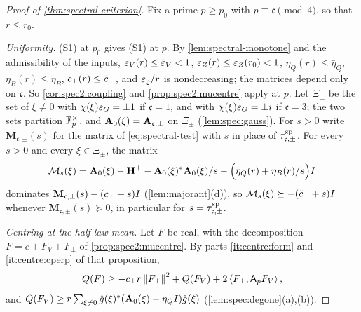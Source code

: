 \begin{proof}[Proof of \cref{thm:spectral-criterion}]
Fix a prime $p\ge p_0$ with $p\equiv\mathfrak c\pmod4$, so that $r\le r_0$.

\emph{Uniformity.} (S1) at $p_0$ gives (S1) at $p$. By \cref{lem:spectral-monotone} and
the admissibility of the inputs, $\varepsilon_V(r)\le\bar{\varepsilon}_V<1$, $\varepsilon_Z(r)\le\varepsilon_Z(r_0)<1$,
$\eta_Q(r)\le\bar\eta_Q$, $\eta_B(r)\le\bar\eta_B$, $c_\perp(r)\le\bar c_{\perp}$, and $\varepsilon_\varrho/r$ is
nondecreasing; the matrices depend only on $\mathfrak c$. So \cref{cor:spec2:coupling} and
\cref{prop:spec2:mucentre} apply at $p$. Let $\Xi_\pm$ be the set of $\xi\ne0$ with
$\chi(\xi)\varepsilon_G=\pm1$ if $\mathfrak c=1$, and with $\chi(\xi)\varepsilon_G=\pm i$ if $\mathfrak c=3$;
the two sets partition $\mathbb F_p^\times$, and $\mathbf A_{0}(\xi)=\mathbf A_{\mathfrak c,\pm}$ on $\Xi_\pm$
(\cref{lem:spec:gauss}). For $s>0$ write $\mathbf M_{\mathfrak c,\pm}(s)$ for the
matrix of \eqref{eq:spectral-test} with $s$ in place of $\tau^{\rm sp}_{\mathfrak c,\pm}$. For
every $s>0$ and every $\xi\in\Xi_\pm$, the matrix
\[
  \mathcal M_s(\xi)=\mathbf A_{0}(\xi)-\mathbf H^+-\mathbf A_{0}(\xi)^*\mathbf A_{0}(\xi)/s
  -\Big(\eta_Q(r)+\eta_B(r)/s\Big)I
\]
dominates $\mathbf M_{\mathfrak c,\pm}(s)-(\bar c_{\perp}+s)I$
(\cref{lem:majorant}(d)), so $\mathcal M_s(\xi)\succeq-(\bar c_{\perp}+s)I$ whenever
$\mathbf M_{\mathfrak c,\pm}(s)\succeq0$, in particular for $s=\tau^{\rm sp}_{\mathfrak c,\pm}$.

\emph{Centring at the half-law mean.} Let $F$ be real, with the decomposition
$F=c+F_V+F_\perp$ of \cref{prop:spec2:mucentre}. By parts
\ref{it:centre:form} and \ref{it:centre:cperp} of that proposition,
\[
  Q(F)\ge-\bar c_{\perp} r\left\|F_\perp\right\|^2+Q(F_V)+2\left\langle F_\perp,\mathsf A_p F_V\right\rangle,
\]
and $Q(F_V)\ge r\sum_{\xi\ne0}\hat g(\xi)^*(\mathbf A_{0}(\xi)-\eta_QI)\hat g(\xi)$
(\cref{lem:spec:degone}(a),(b)).


\end{proof}

